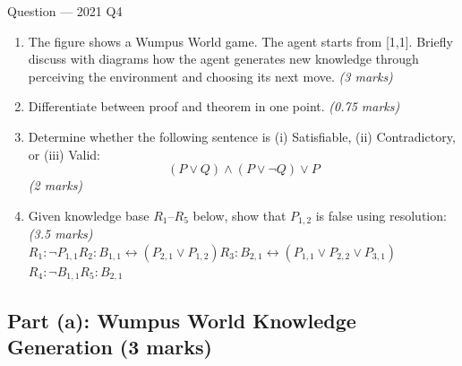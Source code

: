 \documentclass[12pt,a4paper]{article}
\newcommand{\lra}{\leftrightarrow}
\begin{document}
\begin{qbox}{Question --- 2021 Q4}
\begin{enumerate}[label=(\alph*),noitemsep]
  \item The figure shows a Wumpus World game. The agent starts from [1,1]. Briefly discuss with diagrams how the agent generates new knowledge through perceiving the environment and choosing its next move. \hfill\textit{(3 marks)}
  \item Differentiate between proof and theorem in one point. \hfill\textit{(0.75 marks)}
  \item Determine whether the following sentence is (i) Satisfiable, (ii) Contradictory, or (iii) Valid:\\
        \[(P \lor Q) \land (P \lor \neg Q) \lor P\] \hfill\textit{(2 marks)}
  \item Given knowledge base $R_1$--$R_5$ below, show that $P_{1,2}$ is false using resolution: \hfill\textit{(3.5 marks)}\\
        $R_1: \neg P_{1,1}$\quad $R_2: B_{1,1} \lra (P_{2,1} \lor P_{1,2})$\quad $R_3: B_{2,1} \lra (P_{1,1} \lor P_{2,2} \lor P_{3,1})$\\
        $R_4: \neg B_{1,1}$\quad $R_5: B_{2,1}$
\end{enumerate}
\end{qbox}

\subsection{Part (a): Wumpus World Knowledge Generation (3 marks)}
\end{document}
